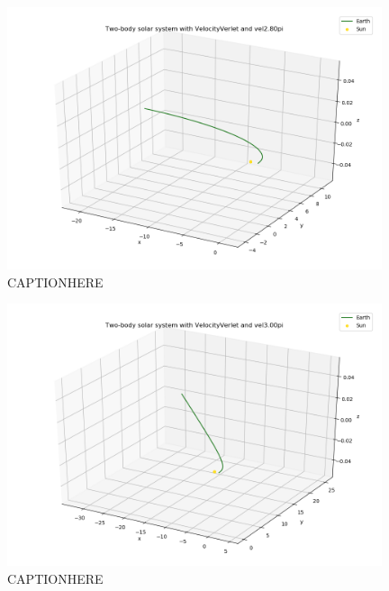 \documentclass{article}
\begin{document}
    \begin{figure}[H]
        \centering
        \includegraphics[width = 11cm]{img/plot3D_S_E_V_vel280pi.png}
        \caption{CAPTIONHERE}
        \label{fig:plot3D_S_E_V_vel280pi}
    \end{figure}

    \begin{figure}[H]
        \centering
        \includegraphics[width = 11cm]{img/plot3D_S_E_V_vel300pi.png}
        \caption{CAPTIONHERE}
        \label{fig:plot3D_S_E_V_vel300pi}
    \end{figure}

\end{document}
